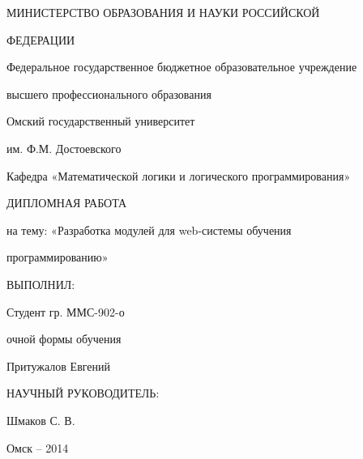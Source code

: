 \thispagestyle{empty}
\large
\begin{center}
МИНИСТЕРСТВО ОБРАЗОВАНИЯ И НАУКИ РОССИЙСКОЙ \par
ФЕДЕРАЦИИ\par 
\vspace{6mm}
Федеральное государственное бюджетное образовательное учреждение\par 
высшего профессионального образования\par 
\vspace{6mm}
Омский государственный университет\par 
им. Ф.М. Достоевского\par 
\vspace{6mm}
Кафедра «Математической логики и логического программирования»\par 
\vspace{6mm}
ДИПЛОМНАЯ РАБОТА\par
на тему: «Разработка модулей для web-системы обучения\par программированию»\par


\end{center}

\vspace{36mm}
\begin{flushright}

ВЫПОЛНИЛ:\par
Студент гр. ММС-902-о\par
очной формы обучения\par
Притужалов Евгений\par

\vspace{6mm}
НАУЧНЫЙ РУКОВОДИТЕЛЬ: \par
Шмаков С. В.\par


\end{flushright}


\vspace{60mm}
\begin{center}
{Омск -- 2014}
\end{center}

\newpage